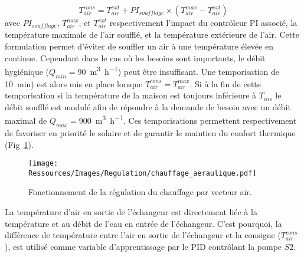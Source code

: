 \begin{equation}\label{eq:temp_soufflage}
    T_{air}^{cons} = T_{air}^{ext} + PI_{soufflage} \times (T_{air}^{max} - T_{air}^{ext})
\end{equation}
avec $PI_{soufflage}$, $T_{air}^{max}$, et $T_{air}^{ext}$ respectivement l’impact du
contrôleur PI associé, la température maximale de l’air soufflé, et la température
extérieure de l’air. Cette formulation permet d’éviter de souffler un air à une
température élevée en continue. Cependant dans le cas où les besoins sont importants, le
débit hygiénique ($Q_{min} = $\SI{90}{\meter\cubed\per\hour}) peut être insuffisant. Une
temporisation de \SI{10}{min}) est alors mis en place lorsque $T_{air}^{cons} =
T_{air}^{max}$. Si à la fin de cette temporisation si la température de la maison est
toujours inférieure à $T_{ins}$ le débit soufflé est modulé afin de répondre à la demande
de besoin avec un débit maximal de $Q_{max} = $\SI{900}{\meter\cubed\per\hour}. Ces
temporisations permettent respectivement de favoriser en priorité le solaire et de
garantir le maintien du confort thermique (Fig~\ref{fig:chauffage_aeraulique}).

\begin{figure}
    \begin{center}
        \texttt{[image: Ressources/Images/Regulation/chauffage\_aeraulique.pdf]}
    \end{center}
    \caption{Fonctionnement de la régulation du chauffage par vecteur air.
             \label{fig:chauffage_aeraulique}}
\end{figure}

La température d’air en sortie de l’échangeur est directement liée à la température et au
débit de l’eau en entrée de l’échangeur. C’est pourquoi, la différence de température
entre l’air en sortie de l’échangeur et la consigne ($T_{air}^{cons}$), est utilisé comme
variable d’apprentissage par le PID contrôlant la pompe $S2$.



